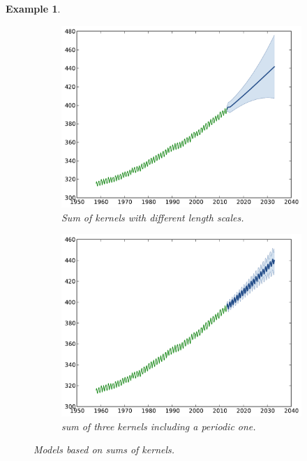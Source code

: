 \documentclass[twoside,openright]{report}
\newtheorem{example}{Example}
\begin{document}
\begin{example}
	\begin{figure}[ht!]
        \centering
        \begin{subfigure}[t]{0.44\textwidth}
                \includegraphics[width=\textwidth]{figures/python/CO2-rbfab}
                \caption{Sum of kernels with different length scales. }
        \end{subfigure}%
        \hspace{1cm}       
        \begin{subfigure}[t]{0.44\textwidth}
                \includegraphics[width=\textwidth]{figures/python/CO2-rbfabpq}
                \caption{sum of three kernels including a periodic one.}
        \end{subfigure}
        \caption{Models based on sums of kernels.}
        \label{fig:CO2top}
	\end{figure}
\end{example}
\end{document}
